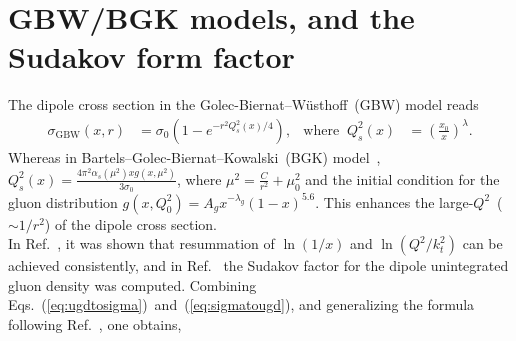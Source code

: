 \documentclass{appolb}
\begin{document}
\section{GBW/BGK models, and the Sudakov form factor}
The dipole cross section in the Golec-Biernat--W\"usthoff~(GBW) model reads~\cite{Golec-Biernat:1998zce}
\begin{align}
\sigma_\mathrm{GBW}(x,r) &=\sigma_0 \left(1-e^{-r^2 Q_s^2(x)/4}\right), & \mathrm{where}\;\; Q^2_s(x)&=\left(\frac{x_0}{x}\right)^{\lambda}.
\label{eq:sigma-gbw}
\end{align}
Whereas in Bartels--Golec-Biernat--Kowalski~(BGK) model~\cite{Bartels:2002cj},
$Q^2_s(x)= \frac{4\pi^2 \alpha_s(\mu^2) x g(x,\mu^2)}{3 \sigma_0} $,
where $\mu^2=\frac{C}{r^2} + \mu_0^2$ and the initial condition for the gluon distribution $g(x,Q_0^2)=A_g x^{-\lambda_g}(1-x)^{5.6}$.
This enhances the large-$Q^2$~($\sim 1/r^2$) of the dipole cross section. \\
In Ref.~\cite{Mueller:2012uf, Mueller:2016gko}, it was shown that resummation of $\ln(1/x)$ and $\ln(Q^2/k_t^2)$ can be achieved consistently, and in Ref.~\cite{Xiao:2017yya} the Sudakov factor for the dipole unintegrated gluon density was computed. 
Combining Eqs.~(\ref{eq:ugdtosigma})~and~(\ref{eq:sigmatougd}), and generalizing the formula following Ref.~\cite{Xiao:2017yya}, one obtains,
\end{document}
